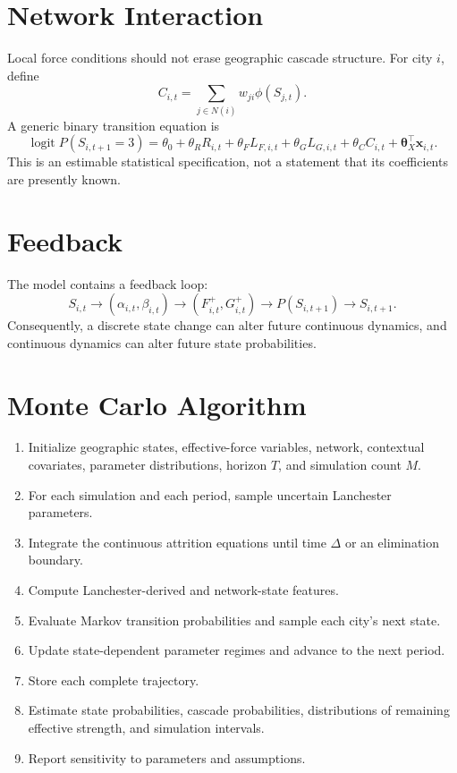 \documentclass[11pt,letterpaper]{article}
\begin{document}
\section{Network Interaction}
Local force conditions should not erase geographic cascade structure. For city $i$, define
\begin{equation}
C_{i,t}=\sum_{j\in N(i)}w_{ji}\phi(S_{j,t}).
\end{equation}
A generic binary transition equation is
\begin{equation}
\operatorname{logit}P(S_{i,t+1}=3)
=
\theta_0+\theta_RR_{i,t}+\theta_FL_{F,i,t}+\theta_GL_{G,i,t}+\theta_CC_{i,t}+\boldsymbol{\theta}_X^{\top}\mathbf{x}_{i,t}.
\label{eq:binary-hybrid}
\end{equation}
This is an estimable statistical specification, not a statement that its coefficients are presently known.

\section{Feedback}
The model contains a feedback loop:
\begin{equation}
S_{i,t}
\rightarrow
(\alpha_{i,t},\beta_{i,t})
\rightarrow
(F_{i,t}^{+},G_{i,t}^{+})
\rightarrow
P(S_{i,t+1})
\rightarrow
S_{i,t+1}.
\end{equation}
Consequently, a discrete state change can alter future continuous dynamics, and continuous dynamics can alter future state probabilities.

\section{Monte Carlo Algorithm}
\begin{enumerate}[leftmargin=2em]
\item Initialize geographic states, effective-force variables, network, contextual covariates, parameter distributions, horizon $T$, and simulation count $M$.
\item For each simulation and each period, sample uncertain Lanchester parameters.
\item Integrate the continuous attrition equations until time $\Delta$ or an elimination boundary.
\item Compute Lanchester-derived and network-state features.
\item Evaluate Markov transition probabilities and sample each city's next state.
\item Update state-dependent parameter regimes and advance to the next period.
\item Store each complete trajectory.
\item Estimate state probabilities, cascade probabilities, distributions of remaining effective strength, and simulation intervals.
\item Report sensitivity to parameters and assumptions.
\end{enumerate}
\end{document}
